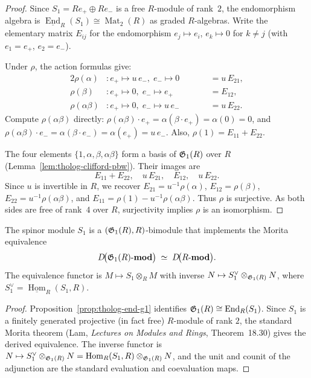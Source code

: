 \begin{proof}
Since $S_1 = R e_+ \oplus R e_-$ is a free $R$-module of
rank~$2$, the endomorphism algebra is
$\underline{\operatorname{End}}_R(S_1) \cong \operatorname{Mat}_2(R)$
as graded $R$-algebras.
Write the elementary matrix $E_{ij}$ for the endomorphism
$e_j \mapsto e_i$, $e_k \mapsto 0$ for $k \neq j$
(with $e_1 = e_+$, $e_2 = e_-$).

Under $\rho$, the action formulas give:
\begin{alignat*}{2}
\rho(\alpha) &: e_+ \mapsto u\,e_-,\; e_- \mapsto 0
&\qquad &= u\,E_{21}, \\
\rho(\beta) &: e_+ \mapsto 0,\; e_- \mapsto e_+
&\qquad &= E_{12}, \\
\rho(\alpha\beta) &: e_+ \mapsto 0,\; e_- \mapsto u\,e_-
&\qquad &= u\,E_{22}.
\end{alignat*}
Compute $\rho(\alpha\beta)$ directly:
$\rho(\alpha\beta) \cdot e_+ = \alpha(\beta \cdot e_+)
= \alpha(0) = 0$, and
$\rho(\alpha\beta) \cdot e_- = \alpha(\beta \cdot e_-)
= \alpha(e_+) = u\,e_-$.
Also, $\rho(1) = E_{11} + E_{22}$.

The four elements $\{1, \alpha, \beta, \alpha\beta\}$ form
a basis of $\mathfrak{G}_1(R)$ over $R$
(Lemma~\ref{lem:tholog-clifford-pbw}).
Their images are
\[
E_{11} + E_{22},\quad
u\,E_{21},\quad
E_{12},\quad
u\,E_{22}.
\]
Since $u$ is invertible in $R$, we recover
$E_{21} = u^{-1}\rho(\alpha)$,
$E_{12} = \rho(\beta)$,
$E_{22} = u^{-1}\rho(\alpha\beta)$, and
$E_{11} = \rho(1) - u^{-1}\rho(\alpha\beta)$.
Thus $\rho$ is surjective.
As both sides are free of rank~$4$ over $R$, surjectivity
implies $\rho$ is an isomorphism.
\end{proof}

\begin{corollary}
The spinor module $S_1$ is a $(\mathfrak{G}_1(R), R)$-bimodule that
implements the Morita equivalence
\[
D\!\bigl(\mathfrak{G}_1(R)\text{-}\mathbf{mod}\bigr)
\;\simeq\;
D\!\bigl(R\text{-}\mathbf{mod}\bigr).
\]
The equivalence functor is $M \mapsto S_1 \otimes_R M$ with
inverse $N \mapsto S_1^\vee \otimes_{\mathfrak{G}_1(R)} N$, where
$S_1^\vee = \underline{\operatorname{Hom}}_R(S_1, R)$.
\end{corollary}

\begin{proof}
Proposition~\ref{prop:tholog-end-g1} identifies
$\mathfrak{G}_1(R) \cong \operatorname{End}_R(S_1)$.
Since $S_1$ is a finitely generated projective (in fact free)
$R$-module of rank $2$, the standard Morita theorem
(Lam, \emph{Lectures on Modules and Rings}, Theorem~18.30)
gives the derived equivalence.
The inverse functor is
$N \mapsto S_1^\vee \otimes_{\mathfrak{G}_1(R)} N
= \operatorname{Hom}_R(S_1, R) \otimes_{\mathfrak{G}_1(R)} N$,
and the unit and counit of the adjunction are the standard
evaluation and coevaluation maps.
\end{proof}

